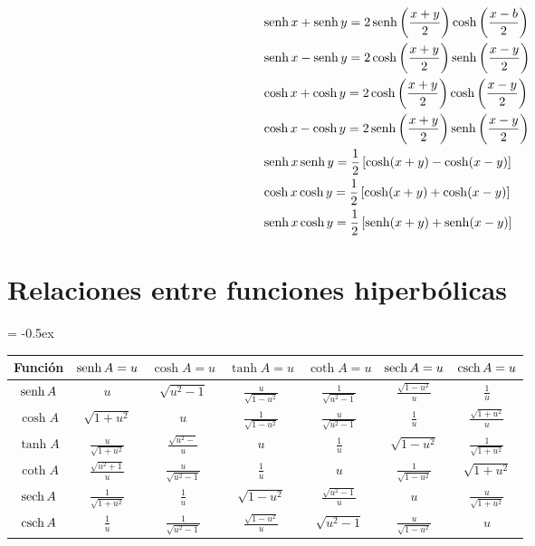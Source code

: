 \begin{align*}
&\operatorname{senh} x + \operatorname{senh} y = 2\operatorname{senh}\left( \frac{x+y}{2} \right)\cosh\left( \frac{x-b}{2}\right)\\
&\operatorname{senh} x - \operatorname{senh} y = 2\cosh\left( \frac{x+y}{2} \right)\operatorname{senh}\left( \frac{x-y}{2}\right)\\
&\cosh x + \cosh y = 2\cosh\left( \frac{x+y}{2} \right)\cosh\left( \frac{x-y}{2}\right)\\
&\cosh x - \cosh y = 2\operatorname{senh}\left( \frac{x+y}{2} \right)\operatorname{senh}\left( \frac{x-y}{2}\right)\\
&\operatorname{senh} x \operatorname{senh} y = \frac{1}{2}\left[ \cosh (x+y)-\cosh (x-y) \right]\\
&\cosh x \cosh y = \frac{1}{2}\left[ \cosh (x+y)+\cosh (x-y) \right]\\
&\operatorname{senh} x \cosh y = \frac{1}{2}\left[ \operatorname{senh} (x+y)+\operatorname{senh} (x-y) \right]
\end{align*}

\section*{Relaciones entre funciones hiperbólicas}

\begin{table}[htb]
\extrarowheight = -0.5ex
\renewcommand{\arraystretch}{1.9}
\centering
\begin{tabular}{|c|c|c|c|c|c|c|}
\hline
Función & $\operatorname{senh} A = u$ & $\cosh A = u $ & $\tanh A = u$ & $\coth A = u$ & $\operatorname{sech} A = u$ & $\operatorname{csch} A = u$ \\ \hline
$\operatorname{senh} A$ & $u$ & $\sqrt{u^2-1}$ & $\frac{u}{\sqrt{1-u^2}}$ & $\frac{1}{\sqrt{u^2-1}}$ & $\frac{\sqrt{1-u^2}}{u}$ & $\frac{1}{u}$ \\ \hline
$\cosh A$ & $\sqrt{1+u^2}$ & $u$ & $\frac{1}{\sqrt{1-u^2}}$ & $\frac{u}{\sqrt{u^2-1}}$ & $\frac{1}{u}$ & $\frac{\sqrt{1+u^2}}{u}$\\ \hline
$\tanh A$ & $\frac{u}{\sqrt{1+u^2}}$ & $\frac{\sqrt{u^2-}}{u}$ & $u$ & $\frac{1}{u}$ & $\sqrt{1-u^2}$ & $\frac{1}{\sqrt{1+u^2}}$\\ \hline
$\coth A$ & $\frac{\sqrt{u^2+1}}{u}$ & $\frac{u}{\sqrt{u^2-1}}$ & $\frac{1}{u}$ & $u$ & $\frac{1}{\sqrt{1-u^2}}$ & $\sqrt{1+u^2}$\\ \hline
$\operatorname{sech} A$ & $\frac{1}{\sqrt{1+u^2}}$ & $\frac{1}{u}$ & $\sqrt{1-u^2}$ & $\frac{\sqrt{u^2-1}}{u}$ & $u$ & $\frac{u}{\sqrt{1+u^2}}$\\ \hline
$\operatorname{csch} A$ & $\frac{1}{u}$ & $\frac{1}{\sqrt{u^2-1}}$ & $\frac{\sqrt{1-u^2}}{u}$ & $\sqrt{u^2-1}$ & $\frac{u}{\sqrt{1-u^2}}$ & $u$\\ \hline
\end{tabular}
\end{table}

